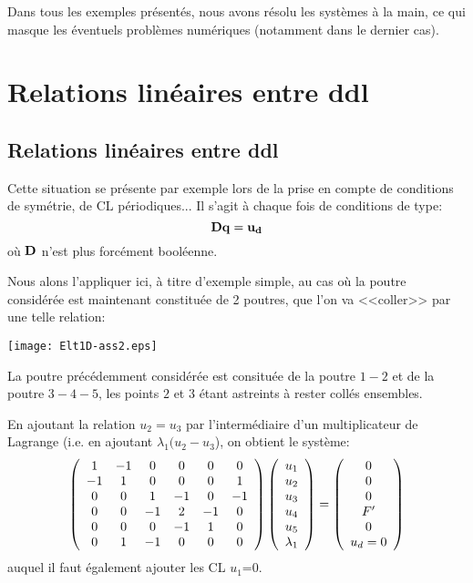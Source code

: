 \medskip
Dans tous les exemples présentés, nous avons résolu les systèmes à la main, ce qui masque les éventuels
problèmes numériques (notamment dans le dernier cas).


\medskip
\ifVersionAvecExemplesSepares
   \section{Relations linéaires entre ddl}
\else
   \subsection{Relations linéaires entre ddl}
\fi

Cette situation se présente par exemple lors de la prise en compte de conditions de symétrie, de CL périodiques...
Il s'agit à chaque fois de conditions de type:
\begin{equation}
\mathbf{D}\mathbf{q} = \mathbf{u_d}
\end{equation}
où $\mathbf{D}$ n'est plus forcément booléenne.

\medskip
Nous alons l'appliquer ici, à titre d'exemple simple, au cas où la poutre considérée est maintenant constituée de 2
poutres, que l'on va <<coller>> par une telle relation:\\

\centerline{\texttt{[image: Elt1D-ass2.eps]}}

La poutre précédemment considérée est consituée de la poutre $1-2$ et de la poutre $3-4-5$, les points $2$ et $3$
étant astreints à rester collés ensembles.

\medskip
En ajoutant la relation $u_2=u_3$ par l'intermédiaire d'un multiplicateur de Lagrange
 (i.e. en ajoutant $\lambda_1(u_2-u_3$), on obtient le système:
\begin{equation}
\left( \begin{array}{cccccc} 1&-1&0&0&0&0 \\ -1&1&0&0&0&1 \\ 0&0&1&-1&0&-1\\ 0&0&-1&2&-1&0\\ 0&0&0&-1&1&0 \\ 0&1&-1&0&0&0
\end{array}\right)
\left( \begin{array}{c} u_1\\u_2\\u_3\\u_4\\ u_5\\ \lambda_1 \end{array}\right)
=
\left( \begin{array}{c} 0\\0\\0\\F' \\ 0 \\ u_d=0\end{array}\right)
\end{equation}
auquel il faut également ajouter les CL $u_1$=0.

